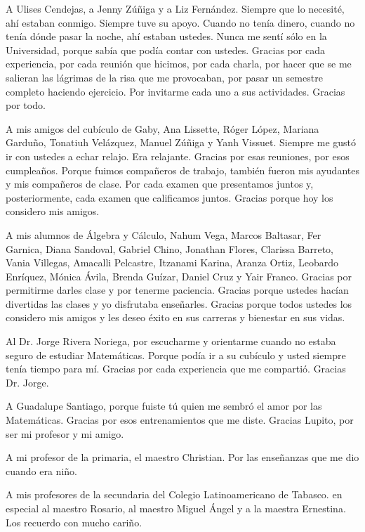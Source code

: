 A Ulises Cendejas, a Jenny Zúñiga y a Liz Fernández. Siempre que lo necesité, ahí estaban conmigo. Siempre tuve su apoyo. Cuando no tenía dinero, cuando no tenía dónde pasar la noche, ahí estaban ustedes. Nunca me sentí sólo en la Universidad, porque sabía que podía contar con ustedes. Gracias por cada experiencia, por cada reunión que hicimos, por cada charla, por hacer que se me salieran las lágrimas de la risa que me provocaban, por pasar un semestre completo haciendo ejercicio. Por invitarme cada uno a sus actividades. Gracias por todo.


A mis amigos del cubículo de Gaby, Ana Lissette, Róger López, Mariana Garduño, Tonatiuh Velázquez, Manuel Zúñiga y Yanh Vissuet. Siempre me gustó ir con ustedes a echar relajo. Era relajante. Gracias por esas reuniones, por esos cumpleaños. Porque fuimos compañeros de trabajo, también fueron mis ayudantes y mis compañeros de clase. Por cada examen que presentamos juntos y, posteriormente, cada examen que calificamos juntos. Gracias porque hoy los considero mis amigos. 
 
A mis alumnos de Álgebra y Cálculo, Nahum Vega, Marcos Baltasar, Fer Garnica, Diana Sandoval, Gabriel Chino, Jonathan Flores, Clarissa Barreto, Vania Villegas, Amacalli Pelcastre, Itzanami Karina, Aranza Ortiz, Leobardo Enríquez, Mónica Ávila, Brenda Guízar, Daniel Cruz y Yair Franco. Gracias por permitirme darles clase y por tenerme paciencia. Gracias porque ustedes hacían divertidas las clases y yo disfrutaba enseñarles. Gracias porque todos ustedes los considero mis amigos y les deseo éxito en sus carreras y bienestar en sus vidas.



Al Dr. Jorge Rivera Noriega, por escucharme y orientarme cuando no estaba seguro de estudiar Matemáticas. Porque podía ir a su cubículo y usted siempre tenía tiempo para mí. Gracias por cada experiencia que me compartió. Gracias Dr. Jorge.


A Guadalupe Santiago, porque fuiste tú quien me sembró el amor por las Matemáticas. Gracias por esos entrenamientos que me diste. Gracias Lupito, por ser mi profesor y mi amigo. 


A mi profesor de la primaria, el maestro Christian. Por las enseñanzas que me dio cuando era niño.


A mis profesores de la secundaria del Colegio Latinoamericano de Tabasco. en especial al maestro Rosario, al maestro Miguel Ángel y a la maestra Ernestina. Los recuerdo con mucho cariño. 


